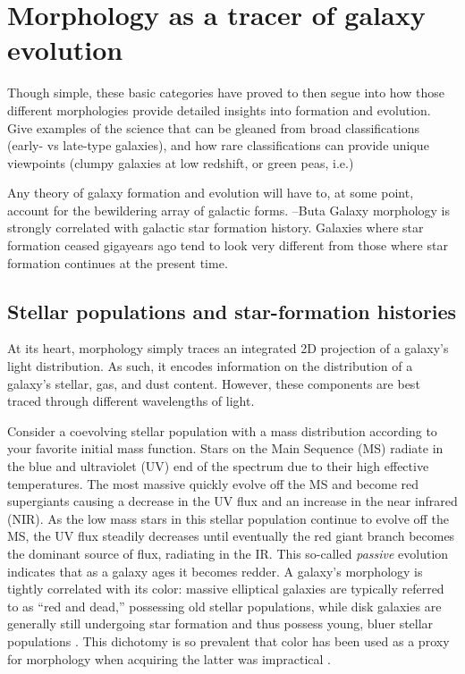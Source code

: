 \section{Morphology as a tracer of galaxy evolution}
Though simple, these basic categories have proved to then segue into how those different morphologies provide detailed insights into formation and evolution. Give examples of the science that can be gleaned from broad classifications (early- vs late-type galaxies), and how rare classifications can provide unique viewpoints (clumpy galaxies at low redshift, or green peas, i.e.)

Any theory of galaxy formation and evolution will
have to, at some point, account for the bewildering array of galactic forms. --Buta
 Galaxy morphology is strongly correlated with galactic star formation history. Galaxies
where star formation ceased gigayears ago tend to look very different from those where star
formation continues at the present time. 


\subsection{Stellar populations and star-formation histories}
At its heart, morphology simply traces an integrated 2D projection of a galaxy's light distribution. As such, it encodes information on the distribution of a galaxy's stellar, gas, and dust content. However, these components are best traced through different wavelengths of light. 

Consider a coevolving stellar population with a mass distribution according to your favorite initial mass function. Stars on the Main Sequence (MS) radiate in the blue and ultraviolet (UV) end of the spectrum due to their high effective temperatures. The most massive quickly evolve off the MS and become red supergiants causing a decrease in the UV flux and an increase in the near infrared (NIR). As the low mass stars in this stellar population continue to evolve off the MS, the UV flux steadily decreases until eventually the red giant branch becomes the dominant source of flux, radiating in the IR. This so-called \textit{passive} evolution indicates that as a galaxy ages it becomes redder. A galaxy's morphology is tightly correlated with its color: massive elliptical galaxies are typically referred to as ``red and dead,'' possessing old stellar populations, while disk galaxies are generally still undergoing star formation and thus possess young, bluer stellar populations \citep[e.g.,][]{Strateva2001,Baldry2004b, Cirasuolo2007, Taylor2015}. This dichotomy is so prevalent that color has been used as a proxy for morphology when acquiring the latter was impractical \citep[e.g.,][]{Shen2003, Blanton2003c}. 

